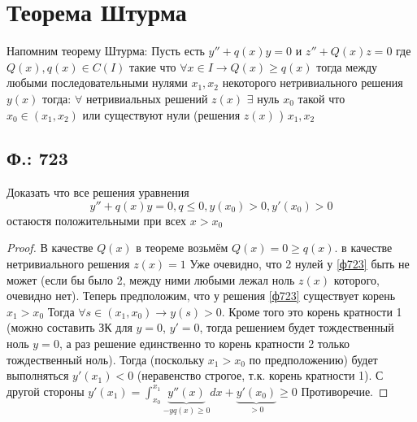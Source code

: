 \documentclass{article}
\begin{document}
\section{Теорема Штурма}
Напомним теорему Штурма: Пусть есть $y''+q(x)y=0$ и $z''+Q(x)z=0$ где $Q(x), q(x) \in C(I)$ такие что $\forall x \in I \rightarrow Q(x) \geq q(x)$ тогда между любыми последовательными нулями $x_1 , x_2$ некоторого нетривиального решения $y(x)$ тогда: $\forall$ нетривиальных решений $z(x)$ $\exists$ нуль $x_0$ такой что $x_0 \in (x_1,x_2)$ или существуют нули (решения $z(x)$ ) $x_1,x_2$
\subsection{Ф.: 723}
Доказать что все решения уравнения
\begin{equation}\label{ф723}
 y''+q(x)y=0, q \leq 0, y(x_0)>0,y'(x_0)>0
\end{equation}
остаюстя положительными при всех $x>x_0$
\begin{proof}
В качестве $Q(x)$ в теореме возьмём $Q(x)=0 \geq q(x)$. в качестве нетривиального решения $z(x)=1$ Уже очевидно, что  2 нулей у  \ref{ф723} быть не может (если бы было 2, между ними любыми лежал ноль $z(x)$ которого, очевидно нет).
Теперь предположим, что у решения  \ref{ф723} существует корень $x_1>x_0$ Тогда $\forall s \in (x_1,x_0) \rightarrow y(s)>0$. Кроме того это корень кратности 1 (можно составить ЗК для $y=0$, $y'=0$, тогда решением будет тождественный ноль $y=0$, а раз решение единственно то корень кратности 2 только тождественный ноль). Тогда (поскольку $x_1>x_0$ по предположению) будет выполняться $y'(x_1)<0$ (неравенство строгое, т.к. корень кратности 1). С другой стороны $y'(x_1)= \int^{x_1}_{x_0} \underbrace{y''(x)}_{-y q(x) \geq 0} dx + \underbrace{y'(x_0)}_{>0} \geq 0$ Противоречие. 
\end{proof}
\end{document}
